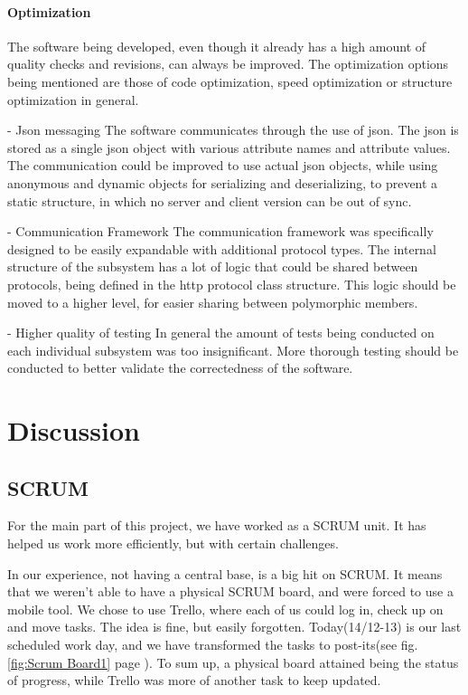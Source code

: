 \subsubsection{Optimization}

The software being developed, even though it already has a high amount of quality checks and revisions, can always be improved.
The optimization options being mentioned are those of code optimization, speed optimization or structure optimization in general.

- Json messaging
The software communicates through the use of json. The json is stored as a single json object with various attribute names and attribute values.
The communication could be improved to use actual json objects, while using anonymous and dynamic objects for serializing and deserializing, to prevent a static structure, in which no server and client version can be out of sync.

- Communication Framework
The communication framework was specifically designed to be easily expandable with additional protocol types. The internal structure of the subsystem has a lot of logic that could be shared between protocols, being defined in the http protocol class structure. This logic should be moved to a higher level, for easier sharing between polymorphic members.

- Higher quality of testing
In general the amount of tests being conducted on each individual subsystem was too insignificant. More thorough testing should be conducted to better validate the correctedness of the software.



\chapter{Discussion}
\label{chap:Discusion}

\section{SCRUM}
For the main part of this project, we have worked as a SCRUM unit. It has helped us work more efficiently, but with certain challenges.

In our experience, not having a central base, is a big hit on SCRUM. It means that we weren't able to have a physical SCRUM board, and were forced to use a mobile tool. We chose to use Trello, where each of us could log in, check up on and move tasks. The idea is fine, but easily forgotten. Today(14/12-13) is our last scheduled work day, and we have transformed the tasks to post-its(see fig. \ref{fig:Scrum Board1} page \pageref{fig:Scrum Board1}). To sum up, a physical board attained being the status of progress, while Trello was more of another task to keep updated.

